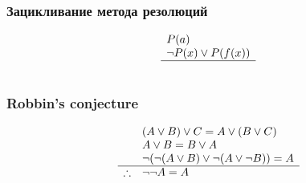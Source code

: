\documentclass[24pt,pdf,hyperref={unicode},aspectratio=169]{beamer}
\begin{document}
\begin{frame}\frametitle{Зацикливание метода резолюций}
\uncover<+->{}
$$
\begin{array}{l}
P(a) \\
\neg P(x) \vee P(f(x))\\
\hline \\
\end{array}
$$
\end{frame}

\begin{frame}\frametitle{Robbin's conjecture}
$$
\begin{array}{l l}
& (A\vee B)\vee C = A \vee (B\vee C) \\
& A\vee B=B\vee A \\
& \neg( \neg(A\vee B) \vee \neg(A\vee \neg B) ) = A\\
\hline 
\therefore & \neg \neg A=A
\end{array}
$$
\end{frame}
\end{document}
